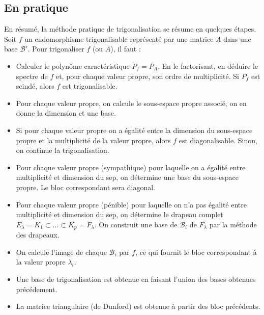 \subsection{En pratique}

En résumé, la méthode pratique de trigonalisation se résume en quelques étapes. 
Soit $f$ un endomorphisme trigonalisable représenté par une matrice $A$ dans une base $\mathcal{B}'$. 
Pour trigonaliser $f$ (ou $A$), il faut :
\begin{itemize}
    \item Calculer le polynôme caractéristique $P_f = P_A$. 
    En le factorisant, en déduire le spectre de $f$ et, pour chaque valeur propre, son ordre de multiplicité. 
    Si $P_f$ est scindé, alors $f$ est trigonalisable. 
    \item Pour chaque valeur propre, on calcule le sous-espace propre associé, on en donne la dimension et une base. 
    \item Si pour chaque valeur propre on a égalité entre la dimension du sous-espace propre et la multiplicité de la valeur 
    propre, alors $f$ est diagonalisable. Sinon, on continue la trigonalisation. 
    \item Pour chaque valeur propre (sympathique) pour laquelle on a égalité entre multiplicité et dimension du sep,
    on détermine une base du sous-espace propre. Le bloc correspondant sera diagonal.
    \item Pour chaque valeur propre (pénible) pour laquelle on n’a pas égalité entre multiplicité et dimension du sep,
    on détermine le drapeau complet $E_\lambda = K_1 \subset \dots \subset K_p = F_\lambda$.
    On construit une base de $\mathcal{B}_i$ de $F_\lambda$ par la méthode des drapeaux.
    \item On calcule l'image de chaque $\mathcal{B}_i$ par $f$, ce qui fournit le bloc correspondant à la valeur propre $\lambda_i$. 
    \item Une base de trigonalisation est obtenue en faisant l'union des bases obtenues précédement. 
    \item La matrice triangulaire (de Dunford) est obtenue à partir des bloc précédents. 
\end{itemize}


